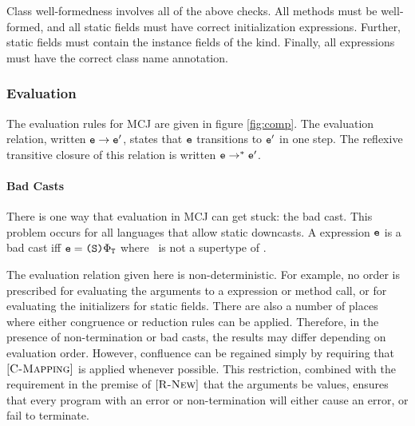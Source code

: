 \documentclass[10pt]{acm-sigplan}
\begin{document}
Class well-formedness involves all of the above checks.
All methods must be well-formed, and all static fields must
have correct initialization expressions.  Further, static fields
must contain the instance fields of the kind.  Finally, all
{} expressions must have the correct class name annotation.


\figExprty

\figWF

\subsubsection{Evaluation}

The evaluation rules for MCJ are given in figure \ref{fig:comp}.
The evaluation relation, written ${\mbox {\tt e}} \rightarrow \mbox {\tt e$'$}$, states that $\mbox {\tt e}$
transitions to $\mbox {\tt e$'$}$ in one step.  The reflexive transitive closure of
this relation is written $\mbox {\tt e} \rightarrow^* \mbox {\tt e$'$}$.

%


\paragraph{Bad Casts}
There is one way that evaluation in MCJ can get stuck: the bad cast.
This problem occurs for all languages that allow static downcasts.  A
expression $\mbox {\tt e}$ is a bad cast iff $\mbox {\tt e} = \mbox{\tt \mbox{\tt (}\mbox {\tt S}\mbox{\tt )}{\ensuremath {\Phi_{\mathtt{{T}}}}}}$ where
\SSS\ is not a supertype of \T.

The evaluation relation given here is non-deterministic. For example,
no order is prescribed for evaluating the arguments to a {}
expression or method call, or for evaluating the initializers for
static fields.  There are also a number of places where either
congruence or reduction rules can be applied.  Therefore, in the
presence of non-termination or bad casts, the results may differ
depending on evaluation order.  However, confluence can be regained
simply by requiring that $[{\textsc {C-Mapping}}]$ is applied whenever
possible.  This restriction, combined with the requirement in the
premise of $[{\textsc {R-New}}]$ that the arguments be values, ensures
that every program with an error or non-termination will either cause
an error, or fail to terminate.  
\end{document}

